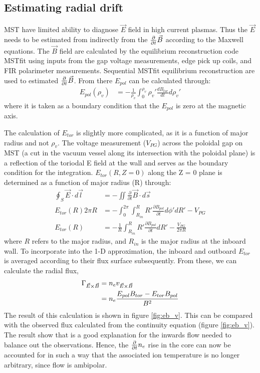 \subsection{Estimating radial \ecb drift}

MST have limited ability to diagnose $\vec{E}$ field in high current plasmas. Thus the $\vec{E}$ needs to be estimated from indirectly from the $\frac{\partial}{\partial t}\vec{B}$ according to the Maxwell equations. The $\vec{B}$ field are calculated by the equilibrium reconstruction code MSTfit using inputs from the gap voltage measurements, edge pick up coils, and FIR polarimeter measurements. Sequential MSTfit equilibrium reconstruction are used to estimated $\frac{\partial}{\partial t}\vec{B}$. From there $E_{pol}$ can be calculated through:
\begin{align}
   E_{pol}(\rho_v) & = -\frac{1}{\rho_v}\int_{0}^{\rho_v}\rho_v' \frac{dB_{tor}}{dt} d\rho_v'
\end{align}
where it is taken as a boundary condition that the $E_{pol}$ is zero at the magnetic axis.

The calculation of $E_{tor}$ is slightly more complicated, as it is a function of major radius and not $\rho_v$. The voltage measurement ($V_{PG}$) across the poloidal gap on MST (a cut in the vacuum vessel along its intersection with the poloidal plane) is a reflection of the toriodal E field at the wall and serves as the boundary condition for the integration. $E_{tor}(R, Z=0)$ along the Z = 0 plane is determined as a function of major radius (R) through:
\begin{align}
\oint_S \vec{E}\cdot d\vec{l} &= -\iint \frac{\partial}{\partial t}\vec{B}\cdot d\vec{s}\\
E_{tor}(R) 2\pi R &= -\int_0^{2\pi}\int_{R_{in}}^{R}R'\frac{\partial B_{pol}}{\partial t} d\phi'dR' - V_{PG}\\
E_{tor}(R) &= -\frac{1}{R}\int_{R_{in}}^{R}R'\frac{\partial B_{pol}}{\partial t} dR' - \frac{V_{PG}}{2\pi R}\label{eqn:E_tor}
\end{align}
where $R$ refers to the major radius, and $R_{in}$ is the major radius at the inboard wall. To incorporate into the 1-D approximation, the inboard and outboard $E_{tor}$ is averaged according to their flux surface subsequently. From these, we can calculate the radial \ecb flux,
\begin{align}
    \Gamma_{\vec{E} \times \vec{B}} &= n_e v_{\vec{E}\times\vec{B}} \nonumber \\
    &= n_{e} \frac{E_{pol}B_{tor} - E_{tor}B_{pol}}{B^2}
\end{align}
The result of this calculation is shown in figure \ref{fig:eb_v}. This can be compared with the observed flux calculated from the continuity equation (figure \ref{fig:eb_v}). The result show that \ecb is a good explanation for the inwards flow needed to balance out the observations. Hence, the $\frac{\partial}{\partial t} n_e$ rise in the core can now be accounted for in such a way that the associated ion temperature is no longer arbitrary, since \ecb flow is ambipolar.

